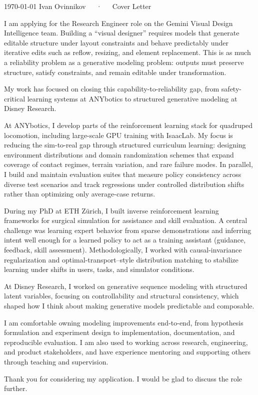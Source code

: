 \documentclass[11pt, a4paper]{awesome-cv}
\begin{document}
\makecvheader[R]

\makecvfooter
  {\today}
  {Ivan Ovinnikov~~~·~~~Cover Letter}
  {}
\makelettertitle

\begin{cvletter}

I am applying for the Research Engineer role on the Gemini Visual Design Intelligence team. Building a ``visual designer'' requires models that generate editable structure under layout constraints and behave predictably under iterative edits such as reflow, resizing, and element replacement. This is as much a reliability problem as a generative modeling problem: outputs must preserve structure, satisfy constraints, and remain editable under transformation.

My work has focused on closing this capability-to-reliability gap, from safety-critical learning systems at ANYbotics to structured generative modeling at Disney Research.

At ANYbotics, I develop parts of the reinforcement learning stack for quadruped locomotion, including large-scale GPU training with IsaacLab. My focus is reducing the sim-to-real gap through structured curriculum learning: designing environment distributions and domain randomization schemes that expand coverage of contact regimes, terrain variation, and rare failure modes. In parallel, I build and maintain evaluation suites that measure policy consistency across diverse test scenarios and track regressions under controlled distribution shifts rather than optimizing only average-case returns.

During my PhD at ETH Zürich, I built inverse reinforcement learning frameworks for surgical simulation for assistance and skill evaluation. A central challenge was learning expert behavior from sparse demonstrations and inferring intent well enough for a learned policy to act as a training assistant (guidance, feedback, skill assessment). Methodologically, I worked with causal-invariance regularization and optimal-transport--style distribution matching to stabilize learning under shifts in users, tasks, and simulator conditions.

At Disney Research, I worked on generative sequence modeling with structured latent variables, focusing on controllability and structural consistency, which shaped how I think about making generative models predictable and composable.

I am comfortable owning modeling improvements end-to-end, from hypothesis formulation and experiment design to implementation, documentation, and reproducible evaluation. I am also used to working across research, engineering, and product stakeholders, and have experience mentoring and supporting others through teaching and supervision.

Thank you for considering my application. I would be glad to discuss the role further.


\end{cvletter}

\makeletterclosing
\end{document}
